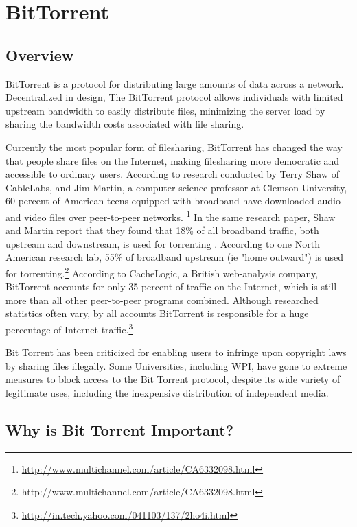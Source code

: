 \documentclass[a4paper,12pt]{report}
\begin{document}
\chapter{BitTorrent}

\section{Overview}
BitTorrent is a protocol for distributing large amounts of data across a network.
Decentralized in design, The BitTorrent protocol allows individuals with limited upstream bandwidth to easily distribute files, minimizing the server load by sharing the bandwidth costs associated with file sharing.

Currently the most popular form of filesharing, BitTorrent has changed the way that people share files on the Internet, making filesharing more democratic and accessible to ordinary users.
According to research conducted by Terry Shaw of CableLabs, and Jim Martin, a computer science professor at Clemson University, 60 percent of American teens equipped with broadband have downloaded audio and video files over peer-to-peer networks. \footnote { \url{http://www.multichannel.com/article/CA6332098.html}}
In the same research paper, Shaw and Martin report that they found that 18\% of all broadband traffic, both upstream and downstream, is used for torrenting .
According to one North American research lab, 55\% of broadband upstream (ie "home outward") is used for torrenting.\footnote{http://www.multichannel.com/article/CA6332098.html}
According to CacheLogic, a British web-analysis company, BitTorrent accounts for only 35 percent of traffic on the Internet, which is still more than all other peer-to-peer programs combined.  
Although researched statistics often vary, by all accounts BitTorrent is responsible for a huge percentage of Internet traffic.\footnote {\url{http://in.tech.yahoo.com/041103/137/2ho4i.html}}

Bit Torrent has been criticized for enabling users to infringe upon copyright laws by sharing files illegally. Some Universities, including WPI, have gone to extreme measures to block access to the Bit Torrent protocol, despite its wide variety of legitimate uses, including the inexpensive distribution of independent media.


\section{Why is Bit Torrent Important?}
\end{document}
